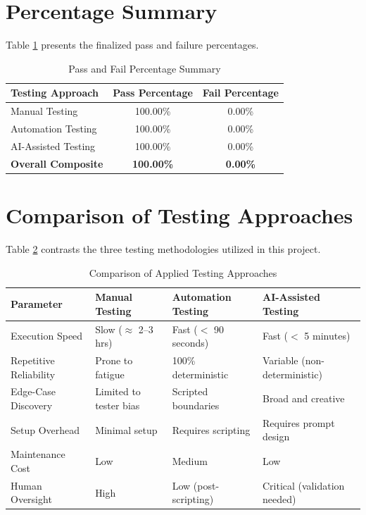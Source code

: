 \documentclass{InternshipReport}
\begin{document}
\section{Percentage Summary}
Table \ref{tab:percentage_summary} presents the finalized pass and failure percentages.

\begin{table}[H]
\centering
\caption{Pass and Fail Percentage Summary}
\label{tab:percentage_summary}
\begin{tabular}{l c c}
\toprule
\textbf{Testing Approach} & \textbf{Pass Percentage} & \textbf{Fail Percentage} \\
\midrule
Manual Testing & 100.00\% & 0.00\% \\
Automation Testing & 100.00\% & 0.00\% \\
AI-Assisted Testing & 100.00\% & 0.00\% \\
\midrule
\textbf{Overall Composite} & \textbf{100.00\%} & \textbf{0.00\%} \\
\bottomrule
\end{tabular}
\end{table}

\section{Comparison of Testing Approaches}
Table \ref{tab:comparison} contrasts the three testing methodologies utilized in this project.

\begin{table}[H]
\centering
\small
\caption{Comparison of Applied Testing Approaches}
\label{tab:comparison}
\begin{tabular}{p{} p{} p{} p{}}
\toprule
\textbf{Parameter} & \textbf{Manual Testing} & \textbf{Automation Testing} & \textbf{AI-Assisted Testing} \\
\midrule
Execution Speed & Slow ($\approx$ 2--3 hrs) & Fast ($<$ 90 seconds) & Fast ($<$ 5 minutes) \\
Repetitive Reliability & Prone to fatigue & 100\% deterministic & Variable (non-deterministic) \\
Edge-Case Discovery & Limited to tester bias & Scripted boundaries & Broad and creative \\
Setup Overhead & Minimal setup & Requires scripting & Requires prompt design \\
Maintenance Cost & Low & Medium & Low \\
Human Oversight & High & Low (post-scripting) & Critical (validation needed) \\
\bottomrule
\end{tabular}
\end{table}
\end{document}

